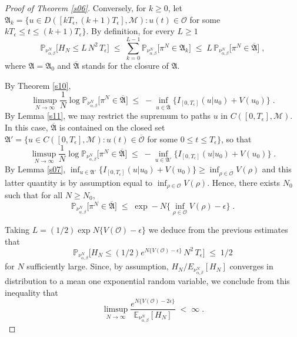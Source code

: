 \documentclass[reqno]{amsart}
\begin{document}
\begin{proof}[Proof of Theorem \ref{s06}]
Conversely, for $k\ge 0$, let ${{\mathfrak A}}_k = \{u \in D([k T_\epsilon,
(k+1) T_\epsilon], {{\mathscr M}}) : u(t)\in{{\mathscr O}}$ for some $k T_\epsilon \le
t\le (k+1) T_\epsilon\}$. By definition, for every $L\ge 1$
\begin{equation*}
{{\mathbb P}}_{\nu^N_{\alpha, \beta}} \big[ H_N\le L\, N^2\, T_\epsilon \big]
\;\le\; \sum_{k=0}^{L-1} {{\mathbb P}}_{\nu^N_{\alpha, \beta}} 
\big[ \pi^N \in {{\mathfrak A}}_k \big] \;\le \; 
L\, {{\mathbb P}}_{\nu^N_{\alpha, \beta}} \big[ \pi^N
\in \overline{{{\mathfrak A}}} \big]\;, 
\end{equation*}
where ${{\mathfrak A}} = {{\mathfrak A}}_0$ and $\overline{{{\mathfrak A}}}$ stands for the closure
of ${{\mathfrak A}}$.

By Theorem \ref{s10},
\begin{equation*}
\limsup_{N\to\infty} \frac 1N \log {{\mathbb P}}_{\nu^N_{\alpha, \beta}} 
\big[ \pi^N  \in \overline{{{\mathfrak A}}} \big] \; \le\; 
-\inf_{u\in \overline{{{\mathfrak A}}}} 
\big\{ I_{[0,T_\epsilon]} (u | u_0 ) + V(u_0)\big\}\;.
\end{equation*}
By Lemma \ref{s11}, we may restrict the supremum to paths $u$ in
$C([0, T_\epsilon], {{\mathscr M}})$. In this case, $\overline{{{\mathfrak A}}}$ is
contained on the closed set ${{\mathfrak A}}' = \{u \in C([0, T_\epsilon], {{\mathscr M}})
: u(t)\in\overline{{{\mathscr O}}}$ for some $0 \le t\le T_\epsilon\}$, so that
\begin{equation*}
\limsup_{N\to\infty} \frac 1N \log {{\mathbb P}}_{\nu^N_{\alpha, \beta}} 
\big[ \pi^N  \in \overline{{{\mathfrak A}}} \big] \; \le\; 
-\inf_{u\in {{\mathfrak A}}'}  \big\{ I_{[0,T_\epsilon]} (u | u_0 ) + V(u_0)\big\}\;.
\end{equation*}
By Lemma \ref{s07}, $\inf_{u\in {{\mathfrak A}}'}  \big\{ I_{[0,T_\epsilon]} (u | u_0 )
+ V(u_0)\big\} \ge \inf_{\rho\in \overline{{{\mathscr O}}}} V(\rho)$ and this
latter quantity is by assumption equal to $\inf_{\rho\in {{\mathscr O}}}
V(\rho)$. Hence, there exists $N_0$ such that for all $N\ge N_0$, 
\begin{equation*}
{{\mathbb P}}_{\nu^N_{\alpha, \beta}} 
\big[ \pi^N  \in \overline{{{\mathfrak A}}} \big] \; \le\; 
\exp - N \big\{ \inf_{\rho\in {{\mathscr O}}} V(\rho) - \epsilon \big\} \;.
\end{equation*}

Taking $L= (1/2) \exp N \big\{ V({{\mathscr O}}) - \epsilon
\big\}$ we deduce from the previous estimates that
\begin{equation*}
{{\mathbb P}}_{\nu^N_{\alpha, \beta}} \big[ H_N\le (1/2)  
e^{N \{ V({{\mathscr O}}) - \epsilon\}} \, N^2\, T_\epsilon \big]
\;\le\; 1/2
\end{equation*}
for $N$ sufficiently large. Since, by assumption,
$H_N/E_{\nu^N_{\alpha, \beta}} [H_N]$ converges in distribution to a
mean one exponential random variable, we conclude from this inequality
that
\begin{equation*}
\limsup_{N\to\infty} \frac{e^{N \{ V({{\mathscr O}}) - 2 \epsilon\}}}{{{\mathbb E}}_{\nu^N_{\alpha, \beta}} [H_N]} \;<\; \infty\;.
\end{equation*}
\end{proof}
\end{document}
